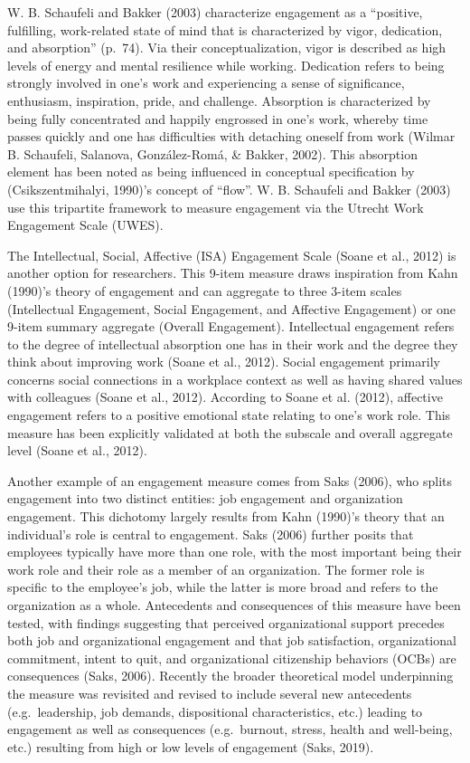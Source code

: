\documentclass[
  man]{apa6}
\begin{document}
W. B. Schaufeli and Bakker (2003) characterize engagement as a ``positive, fulfilling, work-related state of mind that is characterized by vigor, dedication, and absorption'' (p.~74). Via their conceptualization, vigor is described as high levels of energy and mental resilience while working. Dedication refers to being strongly involved in one's work and experiencing a sense of significance, enthusiasm, inspiration, pride, and challenge. Absorption is characterized by being fully concentrated and happily engrossed in one's work, whereby time passes quickly and one has difficulties with detaching oneself from work (Wilmar B. Schaufeli, Salanova, González-Romá, \& Bakker, 2002). This absorption element has been noted as being influenced in conceptual specification by (Csikszentmihalyi, 1990)'s concept of ``flow''. W. B. Schaufeli and Bakker (2003) use this tripartite framework to measure engagement via the Utrecht Work Engagement Scale (UWES).

The Intellectual, Social, Affective (ISA) Engagement Scale (Soane et al., 2012) is another option for researchers. This 9-item measure draws inspiration from Kahn (1990)'s theory of engagement and can aggregate to three 3-item scales (Intellectual Engagement, Social Engagement, and Affective Engagement) or one 9-item summary aggregate (Overall Engagement). Intellectual engagement refers to the degree of intellectual absorption one has in their work and the degree they think about improving work (Soane et al., 2012). Social engagement primarily concerns social connections in a workplace context as well as having shared values with colleagues (Soane et al., 2012). According to Soane et al. (2012), affective engagement refers to a positive emotional state relating to one's work role. This measure has been explicitly validated at both the subscale and overall aggregate level (Soane et al., 2012).

Another example of an engagement measure comes from Saks (2006), who splits engagement into two distinct entities: job engagement and organization engagement. This dichotomy largely results from Kahn (1990)'s theory that an individual's role is central to engagement. Saks (2006) further posits that employees typically have more than one role, with the most important being their work role and their role as a member of an organization. The former role is specific to the employee's job, while the latter is more broad and refers to the organization as a whole. Antecedents and consequences of this measure have been tested, with findings suggesting that perceived organizational support precedes both job and organizational engagement and that job satisfaction, organizational commitment, intent to quit, and organizational citizenship behaviors (OCBs) are consequences (Saks, 2006). Recently the broader theoretical model underpinning the measure was revisited and revised to include several new antecedents (e.g.~leadership, job demands, dispositional characteristics, etc.) leading to engagement as well as consequences (e.g.~burnout, stress, health and well-being, etc.) resulting from high or low levels of engagement (Saks, 2019).
\end{document}
